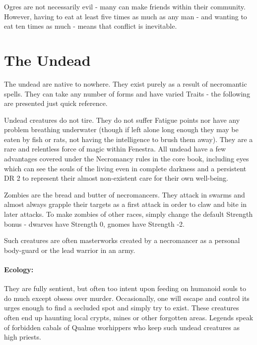 	Ogres are not necessarily evil - many can make friends within their community.  However, having to eat at least five times as much as any man - and wanting to eat ten times as much - means that conflict is inevitable.

\section{The Undead}

The undead are native to nowhere.  They exist purely as a result of necromantic spells.  They can take any number of forms and have varied Traits - the following are presented just quick reference.

Undead creatures do not tire.  They do not suffer Fatigue points nor have any problem breathing underwater (though if left alone long enough they may be eaten by fish or rats, not having the intelligence to brush them away).  They are a rare and relentless force of magic within Fenestra.  All undead have a few advantages covered under the Necromancy rules in the core book, including eyes which can see the souls of the living even in complete darkness and a persistent DR 2 to represent their almost non-existent care for their own well-being.

\label{zombie}
\zombie

Zombies are the bread and butter of necromancers.  They attack in swarms and almost always grapple their targets as a first attack in order to claw and bite in later attacks.  To make zombies of other races, simply change the default Strength bonus - dwarves have Strength 0, gnomes have Strength -2.

\label{undead_knight}


Such creatures are often masterworks created by a necromancer as a personal body-guard or the lead warrior in an army.

\undeadknight

\paragraph{Ecology:} They are fully sentient, but often too intent upon feeding on humanoid souls to do much except obsess over murder.  Occasionally, one will escape and control its urges enough to find a secluded spot and simply try to exist.  These creatures often end up haunting local crypts, mines or other forgotten areas.  Legends speak of forbidden cabals of Qualme worhippers who keep such undead creatures as high priests.

